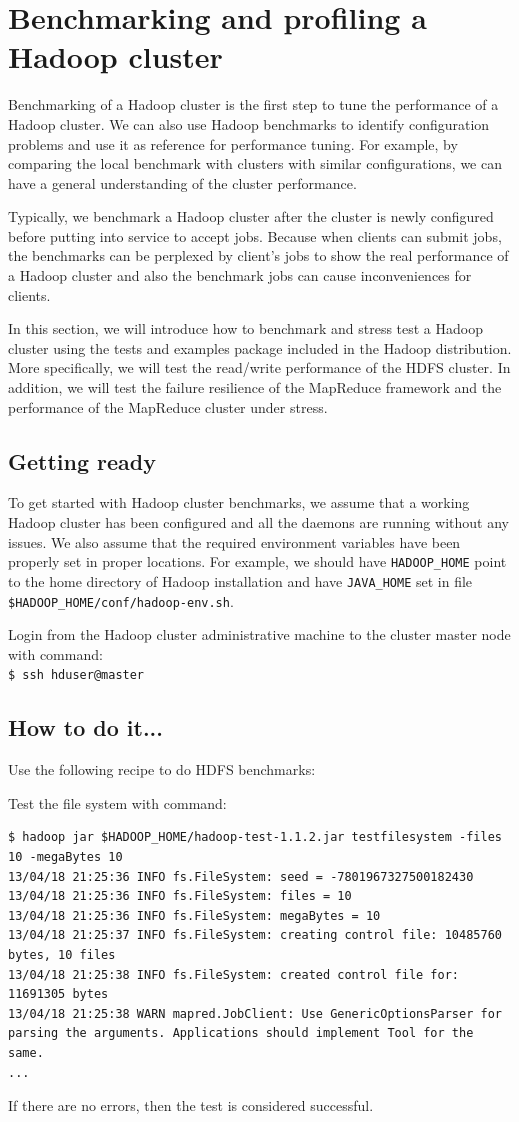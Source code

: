 \section{Benchmarking and profiling a Hadoop cluster}
Benchmarking of a Hadoop cluster is the first step to tune the performance of a Hadoop cluster. We can also use Hadoop benchmarks to identify configuration problems and use it as reference for performance tuning. For example, by comparing the local benchmark with clusters with similar configurations, we can have a general understanding of the cluster performance.

Typically, we benchmark a Hadoop cluster after the cluster is newly configured before putting into service to accept jobs. Because when clients can submit jobs, the benchmarks can be perplexed by client's jobs to show the real performance of a Hadoop cluster and also the benchmark jobs can cause inconveniences for clients.

In this section, we will introduce how to benchmark and stress test a Hadoop cluster using the tests and examples package included in the Hadoop distribution. More specifically, we will test the read/write performance of the HDFS cluster. In addition, we will test the failure resilience of the MapReduce framework and the performance of the MapReduce cluster under stress.

\subsection*{Getting ready}
To get started with Hadoop cluster benchmarks, we assume that a working Hadoop cluster has been configured and all the daemons are running without any issues. We also assume that the required environment variables have been properly set in proper locations. For example, we should have \verb|HADOOP_HOME| point to the home directory of Hadoop installation and have \verb|JAVA_HOME| set in file \verb|$HADOOP_HOME/conf/hadoop-env.sh|.

Login from the Hadoop cluster administrative machine to the cluster master node with command:\\
\verb|$ ssh hduser@master|
\subsection*{How to do it...}
Use the following recipe to do HDFS benchmarks:

Test the file system with command:
\lstset{style=bashstyle}
\begin{lstlisting}
$ hadoop jar $HADOOP_HOME/hadoop-test-1.1.2.jar testfilesystem -files 10 -megaBytes 10
13/04/18 21:25:36 INFO fs.FileSystem: seed = -7801967327500182430
13/04/18 21:25:36 INFO fs.FileSystem: files = 10
13/04/18 21:25:36 INFO fs.FileSystem: megaBytes = 10
13/04/18 21:25:37 INFO fs.FileSystem: creating control file: 10485760 bytes, 10 files
13/04/18 21:25:38 INFO fs.FileSystem: created control file for: 11691305 bytes
13/04/18 21:25:38 WARN mapred.JobClient: Use GenericOptionsParser for parsing the arguments. Applications should implement Tool for the same.
...
\end{lstlisting}
If there are no errors, then the test is considered successful.

